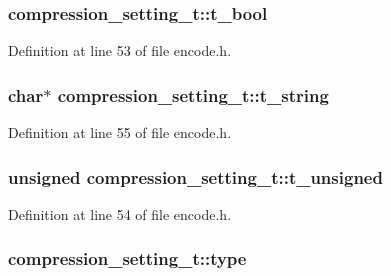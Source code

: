 \subsubsection[{\texorpdfstring{t\+\_\+bool}{t_bool}}]{ compression\+\_\+setting\+\_\+t\+::t\+\_\+bool}\hypertarget{structcompression__setting__t_adf8495e4c63bd645c35e820ac496d579}{}\label{structcompression__setting__t_adf8495e4c63bd645c35e820ac496d579}


Definition at line 53 of file encode.\+h.

\subsubsection[{\texorpdfstring{t\+\_\+string}{t_string}}]{ char$\ast$ compression\+\_\+setting\+\_\+t\+::t\+\_\+string}\hypertarget{structcompression__setting__t_a91e1d54af8d9e89ea451148d2b0b2840}{}\label{structcompression__setting__t_a91e1d54af8d9e89ea451148d2b0b2840}


Definition at line 55 of file encode.\+h.

\subsubsection[{\texorpdfstring{t\+\_\+unsigned}{t_unsigned}}]{\setlength{\rightskip}{0pt plus 5cm}unsigned compression\+\_\+setting\+\_\+t\+::t\+\_\+unsigned}\hypertarget{structcompression__setting__t_aaf46a77bd6258b71af75d875548d94e1}{}\label{structcompression__setting__t_aaf46a77bd6258b71af75d875548d94e1}


Definition at line 54 of file encode.\+h.

\subsubsection[{\texorpdfstring{type}{type}}]{ compression\+\_\+setting\+\_\+t\+::type}\hypertarget{structcompression__setting__t_a1d26b54168b8faf8a640495f85551338}{}\label{structcompression__setting__t_a1d26b54168b8faf8a640495f85551338}



